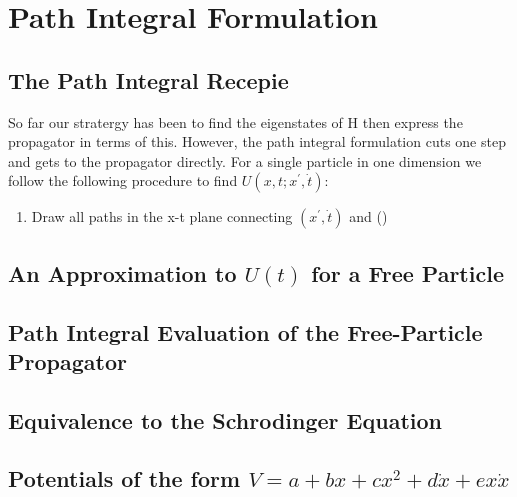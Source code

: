 \chapter{Path Integral Formulation}
\section{The Path Integral Recepie}
So far our stratergy has been to find the eigenstates of H then express the propagator in terms of this. However, the path integral formulation cuts one step and gets to the propagator directly. For a single particle in one dimension we follow the following procedure to find $U(x,t;x^{'}, \dot{t})$:
\begin{enumerate}
	\item Draw all paths in the x-t plane connecting $(x^{'}, \dot{t})$ and ()
\end{enumerate}
\section{An Approximation to $U(t)$ for a Free Particle}
\section{Path Integral Evaluation of the Free-Particle Propagator}
\section{Equivalence to the Schrodinger Equation}
\section{Potentials of the form $V = a + bx + cx^{2} + d \dot{x} + ex \dot{x}$}
